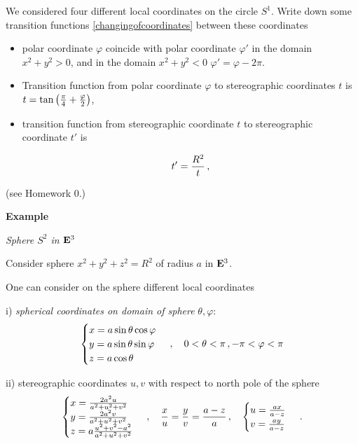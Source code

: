 \documentclass[12pt]{article}
\theoremstyle{theorem}
\numberwithin{equation}{section}
\begin{document}
We considered four different local coordinates
on the circle $S^1$. Write down some
 transition 
functions \eqref{changingofcoordinates}
between these coordinates
 
\begin{itemize}
\item
 polar
coordinate $\varphi$ coincide with
 polar coordinate
  $\varphi'$ in the domain $x^2+y^2>0$,
and in the domain $x^2+y^2<0$
        $\varphi'=\varphi-2\pi$. 

\item
Transition function
from polar coordinate  $\varphi$ 
to stereographic coordinates
  $t$ is  $t=\tan \left(
{\pi\over 4}+{\varphi\over 2}\right)$,

\item
transition function from stereographic
coordinate $t$ to stereographic coordinate
$t'$ is

      \begin{equation*}
       t'={R^2\over t}\,,
     \end{equation*}

\end{itemize}

(see Homework 0.)


\m

{\bf Example}   

    \centerline {\it Sphere  $S^2$ in ${\bf E}^3$}

Consider sphere $x^2+y^2+z^2=R^2$ of 
radius $a$ in ${\bf E}^3$.

One can consider on the sphere 
different local coordinates

i) {\it spherical coordinates on domain of sphere}
  $\theta,\varphi$:
    \begin{equation*}
      \begin{cases}
    x=a\sin\theta\cos\varphi\cr
    y=a\sin\theta\sin\varphi\cr
    z=a\cos\theta\cr
      \end{cases}\,,\quad
           0<\theta<\pi\,,
     -\pi<\varphi<\pi
     \end{equation*}

ii)  stereographic coordinates $u,v$
with respect to north pole of the sphere
     \begin{equation*}
      \begin{cases}
    x={2a^2u\over a^2+u^2+v^2}\cr
    y={2a^2v\over a^2+u^2+v^2}\cr
    z=a{u^2+v^2-a^2\over a^2+u^2+v^2} \cr
      \end{cases}\,,\quad
       {x\over u}=      
       {y\over v}=      
       {a-z\over a}\,,\quad
    \begin{cases}
      u={ax\over a-z}\cr
      v={ay\over a-z}\cr
     \end{cases}\,.     
    \end{equation*}
\end{document}
